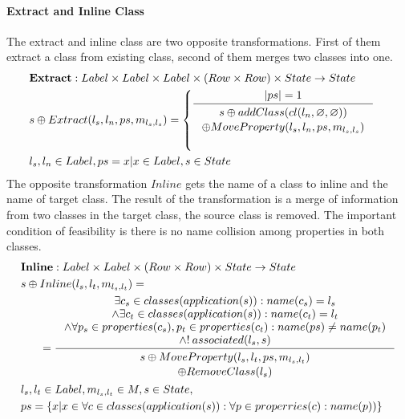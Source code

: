 \documentclass[11pt]{article}
\begin{document}
\paragraph{Extract and Inline Class}
The extract and inline class are two opposite transformations. First of them extract a class from existing class, second of them merges two classes into one.
\begin{align*}
&	\mathbf{Extract} : Label \times Label \times Label \times (Row \times Row) \times State \rightarrow State \\
&	s \oplus Extract(l_s, l_n, ps, m_{l_s, l_s}) = \begin{cases}
	\inference{|ps| = 1}{\begin{gathered}
		s \oplus addClass(cl(l_n, \varnothing, \varnothing)) \\ \oplus MoveProperty(l_s, l_n, ps, m_{l_s, l_s}) \end{gathered}}\\\\
 \end{cases}
	\\
&	l_s, l_n \in Label, ps ={ x | x  \in Label},  s \in State 
\end{align*}
The opposite transformation $Inline$ gets the name of a class to inline and the name of target class. The result of the transformation is a merge of information from two classes in the target class, the source class is removed. The important condition of feasibility is there is no name collision among properties in both classes.
\begin{align*}
&	\mathbf{Inline} : Label \times Label \times (Row \times Row) \times State \rightarrow State \\
&	s \oplus Inline(l_s, l_t, m_{l_s, l_t}) = \\
& \;\;\;\;\;\; =\inference{\exists c_s \in classes(application(s)) : name(c_s) = l_s \\
\wedge \exists c_t \in classes(application(s)) : name(c_t) = l_t \\
\wedge \forall p_s \in properties(c_s), p_t \in properties(c_t) : name(ps) \neq name(p_t) \\
\wedge !\:associated(l_s, s)   }{\begin{gathered}
	s \oplus MoveProperty(l_s, l_t, ps, m_{l_s, l_t}) \\ \oplus RemoveClass(l_s) 
\end{gathered}
}\\
& l_s, l_t \in Label, m_{l_s, l_t} \in M, s \in State, \\ 
& ps = \{x | x \in \forall c \in classes(application(s)) : \forall p \in properries(c) : name(p))\}
\end{align*}
\end{document}
